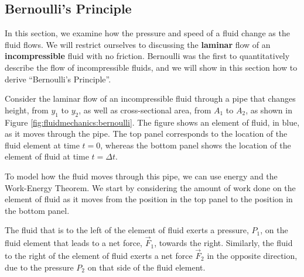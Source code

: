 {{\subsection{Bernoulli's Principle}
In this section, we examine how the pressure and speed of a fluid change as the fluid flows. We will restrict ourselves to discussing the \textbf{laminar} flow of an \textbf{incompressible} fluid with no friction. Bernoulli was the first to quantitatively describe the flow of incompressible fluids, and we will show in this section how to derive ``Bernoulli's Principle''. 

Consider the laminar flow of an incompressible fluid through a pipe that changes height, from $y_1$ to $y_2$, as well as cross-sectional area, from $A_1$ to $A_2$, as shown in Figure \ref{fig:fluidmechanics:bernoulli}. The figure shows an element of fluid, in blue, as it moves through the pipe. The top panel corresponds to the location of the fluid element at time $t=0$, whereas the bottom panel shows the location of the element of fluid at time $t=\Delta t$.

To model how the fluid moves through this pipe, we can use energy and the Work-Energy Theorem. We start by considering the amount of work done on the element of fluid as it moves from the position in the top panel to the position in the bottom panel. 

The fluid that is to the left of the element of fluid exerts a pressure, $P_1$, on the fluid element that leads to a net force, $\vec F_1$, towards the right. Similarly, the fluid to the right of the element of fluid exerts a net force $\vec F_2$ in the opposite direction, due to the pressure $P_2$ on that side of the fluid element.

}}
